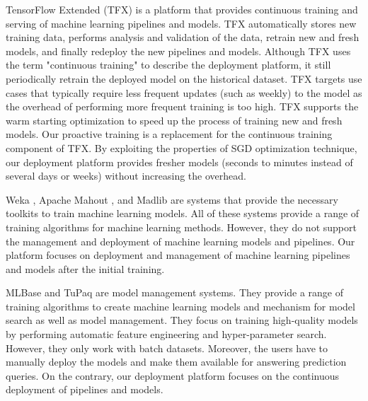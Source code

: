 TensorFlow Extended (TFX) is a platform that provides continuous training and serving of machine learning pipelines and models.
TFX automatically stores new training data, performs analysis and validation of the data, retrain new and fresh models, and finally redeploy the new pipelines and models. 
Although TFX uses the term "continuous training" to describe the deployment platform, it still periodically retrain the deployed model on the historical dataset.
TFX targets use cases that typically require less frequent updates (such as weekly) to the model as the overhead of performing more frequent training is too high.
TFX supports the warm starting optimization to speed up the process of training new and fresh models.
Our proactive training is a replacement for the continuous training component of TFX.
By exploiting the properties of SGD optimization technique, our deployment platform provides fresher models (seconds to minutes instead of several days or weeks) without increasing the overhead.

Weka \cite{hall2009weka}, Apache Mahout \cite{Owen:2011:MA:2132656}, and Madlib \cite{hellerstein2012madlib} are systems that provide the necessary toolkits to train machine learning models. 
All of these systems provide a range of training algorithms for machine learning methods. 
However, they do not support the management and deployment of machine learning models and pipelines. 
Our platform focuses on deployment and management of machine learning pipelines and models after the initial training.

MLBase \cite{kraska2013mlbase} and TuPaq \cite{sparks2015tupaq} are model management systems.
They provide a range of training algorithms to create machine learning models and mechanism for model search as well as model management.
They focus on training high-quality models by performing automatic feature engineering and hyper-parameter search.
However, they only work with batch datasets.
Moreover, the users have to manually deploy the models and make them available for answering prediction queries.
On the contrary, our deployment platform focuses on the continuous deployment of pipelines and models.
